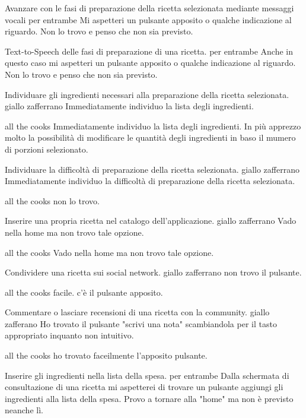 \item Avanzare con le fasi di preparazione della ricetta selezionata mediante messaggi vocali
per entrambe
Mi aspetteri un pulsante apposito o qualche indicazione al riguardo. Non
lo trovo e penso che non sia previsto.


\item Text-to-Speech delle fasi di preparazione di una ricetta.
per entrambe
Anche in questo caso mi aspetteri un pulsante apposito o qualche indicazione al riguardo. Non
lo trovo e penso che non sia previsto.

\item Individuare gli ingredienti necessari alla preparazione della
ricetta selezionata.
giallo zafferrano
Immediatamente individuo la lista degli ingredienti.

all the cooks
Immediatamente individuo la lista degli ingredienti.
In più apprezzo molto la possibilità di modificare le quantità degli
ingredienti in baso il mumero di
porzioni selezionato.

\item Individuare la difficoltà di preparazione della ricetta
selezionata.
giallo zafferrano
Immediatamente individuo la difficoltà di preparazione della ricetta
selezionata.

all the cooks
non lo trovo.

\item Inserire una propria ricetta nel catalogo dell'applicazione.
giallo zafferrano
Vado nella home ma non trovo tale opzione.

all the cooks
Vado nella home ma non trovo tale opzione.

\item Condividere una ricetta sui social network.
giallo zafferrano
non trovo il pulsante.

all the cooks
facile. c'è il pulsante apposito.

\item Commentare o lasciare recensioni di una ricetta con la community.
giallo zafferano
Ho trovato il pulsante "scrivi una nota" scambiandola per il tasto
appropriato inquanto non intuitivo.

all the cooks
ho trovato faceilmente l'apposito pulsante.


\item Inserire gli ingredienti nella lista della spesa.
per entrambe
Dalla schermata di consultazione di una ricetta mi aspetterei di trovare
un pulsante aggiungi gli ingredienti alla lista della spesa. Provo a
tornare alla "home" ma non è previsto neanche lì.



